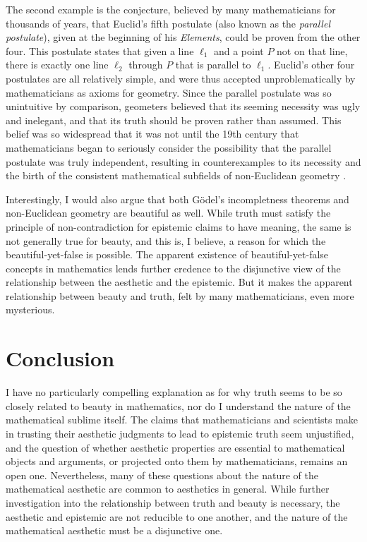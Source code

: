 \documentclass[a4paper,man,natbib]{apa6}
\begin{document}
The second example is the conjecture, believed by many mathematicians for thousands of years, that Euclid's fifth
postulate (also known as the \textit{parallel postulate}), given at the beginning of his \textit{Elements}, could 
be proven from the other four. This postulate states that given a line $\ell_1$ and a point $P$ not on that line, 
there is exactly one line $\ell_2$ through $P$ that is parallel to $\ell_1$. Euclid's other four postulates are all 
relatively simple, 
and were thus accepted unproblematically by mathematicians as axioms for geometry. Since the parallel
postulate was so unintuitive by comparison, geometers believed that its seeming necessity was ugly and inelegant, and
that its truth should be proven rather than assumed. This belief was so widespread that it was not until
the 19th century that mathematicians began to seriously consider the possibility that the parallel postulate was
truly independent, resulting in counterexamples to its necessity and the birth of the consistent mathematical
subfields of non-Euclidean geometry \citep{sep-epistemology-geometry}. 

Interestingly, I would also argue that both Gödel's incompletness theorems and non-Euclidean geometry are beautiful
as well. While truth must satisfy the principle of non-contradiction for epistemic claims to have meaning, the 
same is not generally true for beauty, and this is, I believe, a reason for which the beautiful-yet-false is possible.
The apparent existence of beautiful-yet-false concepts in mathematics lends further credence to the disjunctive
view of the relationship between the aesthetic and the epistemic. But it makes the apparent relationship between
beauty and truth, felt by many mathematicians, even more mysterious.

\section{Conclusion}

I have no particularly compelling explanation as for why truth seems to be so closely related to beauty in mathematics,
nor do I understand the nature of the mathematical sublime itself. The claims that mathematicians and scientists make
in trusting their aesthetic judgments to lead to epistemic truth seem unjustified, and the question of whether
aesthetic properties are essential to mathematical objects and arguments, or projected onto them by mathematicians,
remains an open one. Nevertheless, many of these questions about the nature of the mathematical aesthetic are
common to aesthetics in general. While further investigation into the relationship between truth and beauty is
necessary, the aesthetic and epistemic are not reducible to one another, and the nature of the mathematical
aesthetic must be a disjunctive one.
\end{document}
